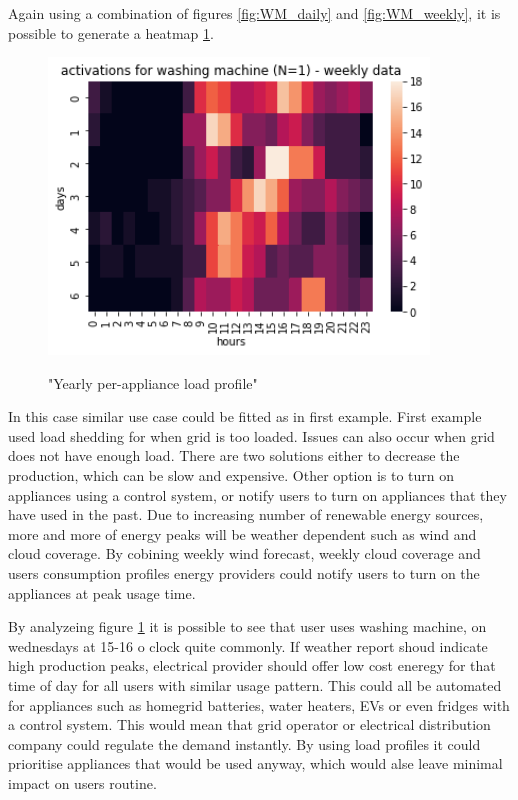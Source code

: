 Again using a combination of figures \ref{fig:WM_daily} and \ref{fig:WM_weekly},
it is possible to generate a heatmap \ref{fig:wm_hm_weekly}.

\begin{figure}[H]
	\centering
	\caption{"Yearly per-appliance load profile"}
	\includegraphics[width=0.9\textwidth]{../Figures/LPS/wm_hm_weekly.png}
	\label{fig:wm_hm_weekly}
\end{figure}

In this case similar use case could be fitted as in first example.
First example used load shedding for when grid is too loaded.
Issues can also occur when grid does not have enough load.
There are two solutions either to decrease the production, which can be slow and expensive.
Other option is to turn on appliances using a control system, or notify users to turn on appliances that they have 
used in the past. 
Due to increasing number of renewable energy sources,
more and more of energy peaks will be weather dependent such as wind and cloud coverage.
By cobining weekly wind forecast, weekly cloud coverage and users consumption profiles energy providers could notify users to turn on the appliances at peak usage time.

By analyzeing figure \ref{fig:wm_hm_weekly} it is possible to see that user uses washing machine,
on wednesdays at 15-16 o clock quite commonly. 
If weather report shoud indicate high production peaks, electrical provider should offer low cost eneregy for that time of day for all users with
similar usage pattern. 
This could all be automated for appliances such  as homegrid batteries, water heaters, EVs or even fridges with a control system.
This would mean that grid operator or electrical distribution company could regulate the demand instantly.
By using load profiles it could prioritise appliances that would be used anyway, which would alse leave minimal impact on users routine. 

